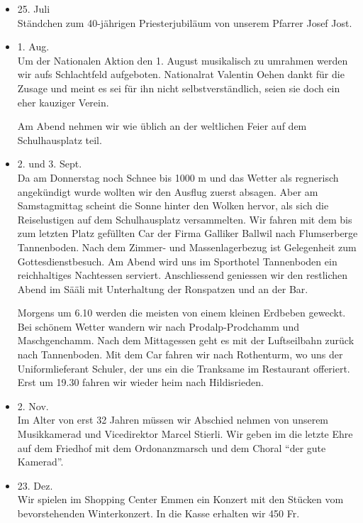 \begin{history}
\begin{itemize}
        \item[]25. Juli\\
        Ständchen zum 40-jährigen Priesterjubiläum von unserem Pfarrer Josef
        Jost.

        \item[]1. Aug.\\
        Um der Nationalen Aktion den 1. August musikalisch zu umrahmen werden
        wir aufs Schlachtfeld aufgeboten. Nationalrat Valentin Oehen dankt für
        die Zusage und meint es sei für ihn nicht selbstverständlich, seien sie
        doch ein eher kauziger Verein.

        Am Abend nehmen wir wie üblich an der weltlichen Feier auf dem
        Schulhausplatz teil.

        \item[]2. und 3. Sept.\\
        Da am Donnerstag noch Schnee bis 1000 m und das Wetter als regnerisch
        angekündigt wurde wollten wir den Ausflug zuerst absagen. Aber am
        Samstagmittag scheint die Sonne hinter den Wolken hervor, als sich die
        Reiselustigen auf dem Schulhausplatz versammelten. Wir fahren mit dem
        bis zum letzten Platz gefüllten Car der Firma Galliker Ballwil nach
        Flumserberge Tannenboden. Nach dem Zimmer- und Massenlagerbezug ist
        Gelegenheit zum Gottesdienstbesuch. Am Abend wird uns im Sporthotel
        Tannenboden ein reichhaltiges Nachtessen serviert. Anschliessend
        geniessen wir den restlichen Abend im Sääli mit Unterhaltung der
        Ronspatzen und an der Bar.

        Morgens um 6.10 werden die meisten von einem kleinen Erdbeben geweckt.
        Bei schönem Wetter wandern wir nach Prodalp-Prodchamm und Maschgenchamm.
        Nach dem Mittagessen geht es mit der Luftseilbahn zurück nach
        Tannenboden. Mit dem Car fahren wir nach Rothenturm, wo uns der
        Uniformlieferant Schuler, der uns ein die Tranksame im Restaurant
        offeriert. Erst um 19.30 fahren wir wieder heim nach Hildisrieden.

        \item[]2. Nov.\\
        Im Alter von erst 32 Jahren müssen wir Abschied nehmen von unserem
        Musikkamerad und Vicedirektor Marcel Stierli. Wir geben im die letzte
        Ehre auf dem Friedhof mit dem Ordonanzmarsch und dem Choral \enquote{der gute
            Kamerad}.

        \item[]23. Dez.\\
        Wir spielen im Shopping Center Emmen ein Konzert mit den Stücken vom
        bevorstehenden Winterkonzert. In die Kasse erhalten wir 450 Fr.

    \end{itemize}

\end{history}

